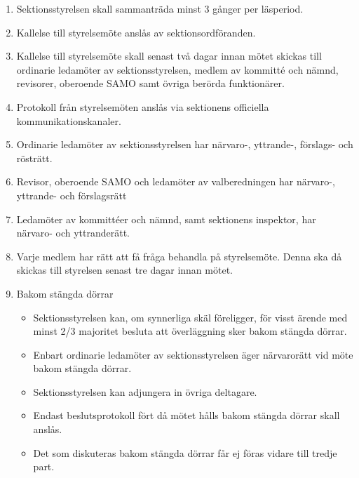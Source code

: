 \documentclass[11pt,a4paper]{article}
\begin{document}
\begin{enumerate}[\thesubsection .1]

\item Sektionsstyrelsen skall sammanträda minst 3 gånger per läsperiod.

\item Kallelse till styrelsemöte anslås av sektionsordföranden.

\item Kallelse till styrelsemöte skall senast två dagar innan mötet skickas till ordinarie ledamöter av sektionsstyrelsen, medlem av kommitté och nämnd, revisorer, oberoende SAMO samt övriga berörda funktionärer.

\item Protokoll från styrelsemöten anslås via sektionens officiella kommunikationskanaler.

\item Ordinarie ledamöter av sektionsstyrelsen har närvaro-, yttrande-, förslags- och rösträtt. 

\item Revisor, oberoende SAMO och ledamöter av valberedningen har närvaro-, yttrande- och förslagsrätt

\item Ledamöter av kommittéer och nämnd, samt sektionens inspektor, har närvaro- och yttranderätt.

\item Varje medlem har rätt att få fråga behandla på styrelsemöte. Denna ska då skickas till styrelsen senast tre dagar innan mötet.


\item Bakom stängda dörrar

\begin{itemize}
\item Sektionsstyrelsen kan, om synnerliga skäl föreligger, för visst ärende med minst 2/3 majoritet besluta att överläggning sker bakom stängda dörrar.
\item Enbart ordinarie ledamöter av sektionsstyrelsen äger närvarorätt vid möte bakom stängda dörrar.
\item Sektionsstyrelsen kan adjungera in övriga deltagare.
\item Endast beslutsprotokoll fört då mötet hålls bakom stängda dörrar skall anslås.
\item Det som diskuteras bakom stängda dörrar får ej föras vidare till tredje part. 
\end{itemize}

\end{enumerate}
\end{document}
